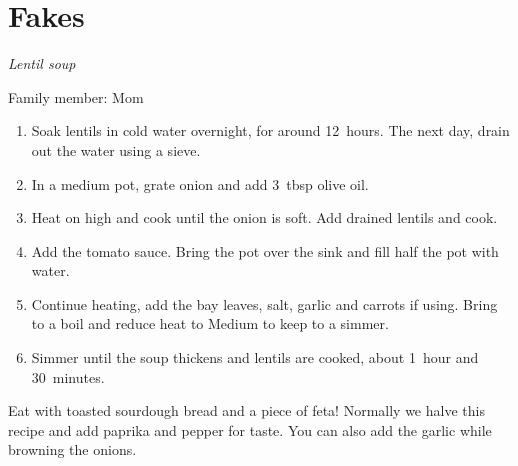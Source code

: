 \chapter{Fakes}
\label{ch:fakes}


\textit{Lentil soup}

Family member: Mom

\begin{enumerate}
    \item Soak lentils in cold water overnight, for around 12~hours. The next day, drain out the water using a sieve.
    \item In a medium pot, grate onion and add 3~tbsp olive oil.
    \item Heat on high and cook until the onion is soft. Add drained lentils and cook.
    \item Add the tomato sauce. Bring the pot over the sink and fill half the pot with water.
    \item Continue heating, add the bay leaves, salt, garlic and carrots if using. Bring to a boil and reduce heat to Medium to keep to a simmer.
    \item Simmer until the soup thickens and lentils are cooked, about 1~hour and 30~minutes.
\end{enumerate}

Eat with toasted sourdough bread and a piece of feta! Normally we halve this recipe and add paprika and pepper for taste. You can also add the garlic while browning the onions.
